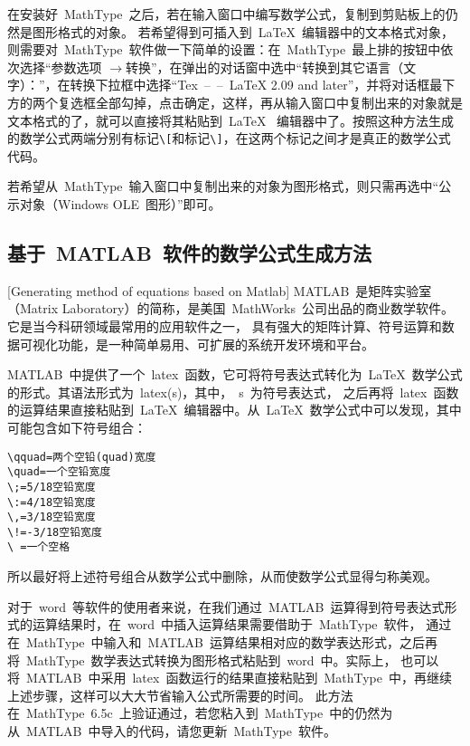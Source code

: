 在安装好~MathType~之后，若在输入窗口中编写数学公式，复制到剪贴板上的仍然是图形格式的对象。
若希望得到可插入到~\LaTeX~编辑器中的文本格式对象，则需要对~MathType~软件做一下简单的设置：在~MathType~最上排的按钮中依次选择“参数选项
$\to$转换”，在弹出的对话窗中选中“转换到其它语言（文字）：”，在转换下拉框中选择“Tex~--~--~LaTeX 2.09 and later”，并将对话框最下方的两个复选框全部勾掉，点击确定，这样，再从输入窗口中复制出来的对象就是文本格式的了，就可以直接将其粘贴到~\LaTeX~
编辑器中了。按照这种方法生成的数学公式两端分别有标记\verb|\[|和标记\verb|\]|，在这两个标记之间才是真正的数学公式代码。

若希望从~MathType~输入窗口中复制出来的对象为图形格式，则只需再选中“公示对象（Windows OLE~图形）”即可。

\subsection{基于~MATLAB~软件的数学公式生成方法}[Generating method of equations based on Matlab]
MATLAB~是矩阵实验室（Matrix Laboratory）的简称，是美国~MathWorks~公司出品的商业数学软件。它是当今科研领域最常用的应用软件之一，
具有强大的矩阵计算、符号运算和数据可视化功能，是一种简单易用、可扩展的系统开发环境和平台。

MATLAB~中提供了一个~latex~函数，它可将符号表达式转化为~\LaTeX~数学公式的形式。其语法形式为~latex(s)，其中，~s~为符号表达式，
之后再将~latex~函数的运算结果直接粘贴到~\LaTeX~编辑器中。从~\LaTeX~数学公式中可以发现，其中可能包含如下符号组合：
\begin{lstlisting}
\qquad=两个空铅(quad)宽度
\quad=一个空铅宽度
\;=5/18空铅宽度
\:=4/18空铅宽度
\,=3/18空铅宽度
\!=-3/18空铅宽度
\ =一个空格
\end{lstlisting}
所以最好将上述符号组合从数学公式中删除，从而使数学公式显得匀称美观。

对于~word~等软件的使用者来说，在我们通过~MATLAB~运算得到符号表达式形式的运算结果时，在~word~中插入运算结果需要借助于~MathType~软件，
通过在~MathType~中输入和~MATLAB~运算结果相对应的数学表达形式，之后再将~MathType~数学表达式转换为图形格式粘贴到~word~中。实际上，
也可以将~MATLAB~中采用~latex~函数运行的结果直接粘贴到~MathType~中，再继续上述步骤，这样可以大大节省输入公式所需要的时间。
此方法在~MathType~6.5c~上验证通过，若您粘入到~MathType~中的仍然为从~MATLAB~中导入的代码，请您更新~MathType~软件。

